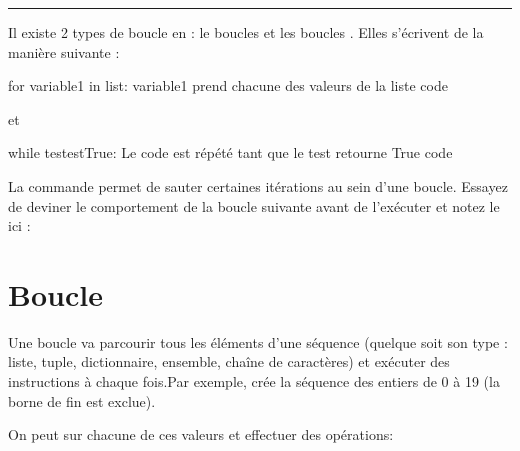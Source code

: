 \documentclass[letterpaper,10pt,english]{sphinxmanual}
\begin{document}
\bigskip\hrule\bigskip


Il existe 2 types de boucle en : le boucles  et les boucles . Elles s’écrivent de la manière suivante :

\begin{sphinxVerbatim}[commandchars=\\\{\}]
for variable1 in list:
    \PYGZsh{} variable1 prend chacune des valeurs de la liste
    code
\end{sphinxVerbatim}

et

\begin{sphinxVerbatim}[commandchars=\\\{\}]
while test\PYGZus{}est\PYGZus{}True:
    \PYGZsh{} Le code est répété tant que le test retourne True
    code
\end{sphinxVerbatim}

La commande  permet de sauter certaines itérations au sein d’une boucle.
Essayez de deviner le comportement de la boucle suivante avant de l’exécuter et notez le ici :



\section{Boucle }
\label{\detokenize{src/OCI04_Boucles:boucle-for}}
Une boucle  va parcourir tous les éléments d’une séquence (quelque soit son type : liste, tuple, dictionnaire, ensemble, chaîne de caractères) et exécuter des instructions à chaque fois.Par exemple,  crée la séquence des entiers de 0 à 19 (la borne de fin est exclue).

On peut  sur chacune de ces valeurs et effectuer des opérations:

\begin{sphinxVerbatim}[commandchars=\\\{\}]
   
     
\end{sphinxVerbatim}
\end{document}
